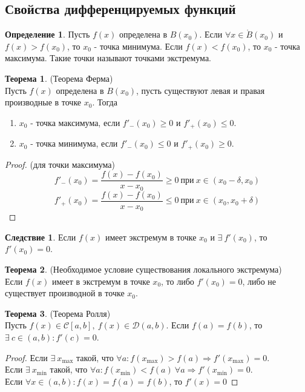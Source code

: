 \documentclass[a4paper, 12pt]{article}
\theoremstyle{definition}
\newtheorem*{definition}{Определение}
\newtheorem*{theorem}{Теорема}
\newtheorem*{consequense}{Следствие}
\begin{document}
        \subsection{Свойства дифференцируемых функций}
        \begin{definition}
            Пусть $f(x)$ определена в $B(x_0)$. Если  $\forall x\in \mathring{B}(x_0)$ и\\
            $f(x)>f(x_0)$, то $x_0$ - точка минимума. Если $f(x)<f(x_0)$, то $x_0$ - точка максимума. Такие точки называют точками экстремума.
        \end{definition} 
        \begin{theorem} (Теорема Ферма)\\
            Пусть $f(x)$ определена в $B(x_0)$, пусть существуют левая и правая производные в точке $x_0$. Тогда
            \begin{enumerate}
                \item $x_0$ - точка максимума, если $f'_-(x_0)\geq 0$ и $f'_+(x_0)\leq 0$.
                \item $x_0$ - точка минимума, если $f'_-(x_0)\leq 0$ и $f'_+(x_0)\geq 0$.
            \end{enumerate}
        \end{theorem} 
        \begin{proof} (для точки максимума)
                \[f'_-(x_0)=\frac{f(x)-f(x_0)}{x-x_0}\geq 0\ \text{при}\ x\in (x_0-\delta,x_0)\]
                \[f'_+(x_0)=\frac{f(x)-f(x_0)}{x-x_0}\leq 0\ \text{при}\ x\in (x_0,x_0+\delta)\]
        \end{proof} 
        \begin{consequense}
            Если $f(x)$ имеет экстремум в точке $x_0$ и $\exists\ f'(x_0)$, то $f'(x_0)=0$.
        \end{consequense} 
        \begin{theorem} (Необходимое условие существования локального экстремума)\\
            Если $f(x)$ имеет в экстремум в точке $x_0$, то либо $f'(x_0)=0$, либо не существует производной в точке $x_0$.
        \end{theorem} 
        \begin{theorem} (Теорема Ролля)\\
            Пусть $f(x)\in \mathcal{C}[a,b],\ f(x)\in \mathcal{D}(a,b)$. Если $f(a)=f(b)$, то $\exists\ c\in (a,b): f'(c)=0$.
        \end{theorem} 
        \begin{proof}
            Если $\exists\ x_{\max}$ такой, что $\forall a: f(x_{\max})>f(a) \Rightarrow f'(x_{\max})=0$.\\
            Если $\exists\ x_{\min}$ такой, что $\forall a: f(x_{\min})<f(a)\ \forall a \Rightarrow f'(x_{\min})=0$.\\
            Если $\forall x\in (a,b): f(x)=f(a)=f(b)$, то $f'(x)=0$
        \end{proof}
\end{document}
